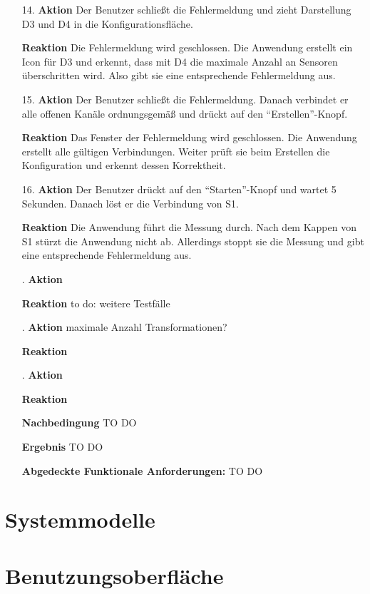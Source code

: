 \documentclass[parskip=full]{scrartcl}
\begin{document}
\begin{itemize}
\begin{itemize}
\item [14.]\textbf{Aktion} Der Benutzer schließt die Fehlermeldung und zieht Darstellung D3 und D4 in die Konfigurationsfläche.
\item []\textbf{Reaktion} Die Fehlermeldung wird geschlossen. Die Anwendung erstellt ein Icon für D3 und erkennt, dass mit D4 die maximale Anzahl an Sensoren überschritten wird. Also gibt sie eine entsprechende Fehlermeldung aus.
\item [15.]\textbf{Aktion} Der Benutzer schließt die Fehlermeldung. Danach verbindet er alle offenen Kanäle ordnungsgemäß und drückt auf den "`Erstellen"'-Knopf.
\item []\textbf{Reaktion} Das Fenster der Fehlermeldung wird geschlossen. Die Anwendung erstellt alle gültigen Verbindungen. Weiter prüft sie beim Erstellen die Konfiguration und erkennt dessen Korrektheit. 
\item [16.]\textbf{Aktion} Der Benutzer drückt auf den "`Starten"'-Knopf und wartet 5 Sekunden. Danach löst er die Verbindung von S1.
\item []\textbf{Reaktion} Die Anwendung führt die Messung durch. Nach dem Kappen von S1 stürzt die Anwendung nicht ab. Allerdings stoppt sie die Messung und gibt eine entsprechende Fehlermeldung aus. 
\item [.]\textbf{Aktion} 
\item []\textbf{Reaktion} to do: weitere Testfälle
\item [.]\textbf{Aktion} maximale Anzahl Transformationen?
\item []\textbf{Reaktion}
\item [.]\textbf{Aktion} 
\item []\textbf{Reaktion}

\item []\textbf{Nachbedingung} TO DO
\item []\textbf{Ergebnis} TO DO

\item []\textbf{Abgedeckte Funktionale Anforderungen:} TO DO

\end{itemize}


\end{itemize}

\section{Systemmodelle}

\section{Benutzungsoberfläche}
\end{document}
